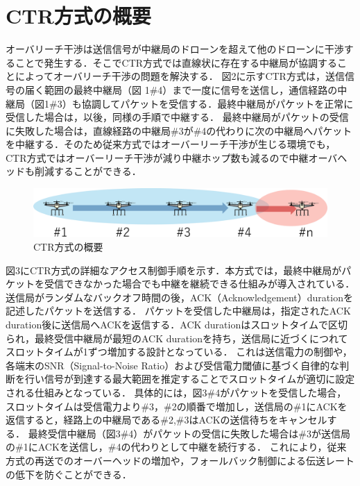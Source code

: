 \documentclass[a4paper,10pt]{ltjsarticle}
\begin{document}
\section{CTR方式の概要}
オーバリーチ干渉は送信信号が中継局のドローンを超えて他のドローンに干渉することで発生する．そこでCTR方式では直線状に存在する中継局が協調することによってオーバリーチ干渉の問題を解決する．
図2に示すCTR方式は，送信信号の届く範囲の最終中継局（図 1\#4）まで一度に信号を送信し，通信経路の中継局（図1\#3）も協調してパケットを受信する．最終中継局がパケットを正常に受信した場合は，以後，同様の手順で中継する．
最終中継局がパケットの受信に失敗した場合は，直線経路の中継局\#3が\#4の代わりに次の中継局へパケットを中継する．そのため従来方式ではオーバーリーチ干渉が生じる環境でも，CTR方式ではオーバーリーチ干渉が減り中継ホップ数も減るので中継オーバヘッドも削減することができる．
\begin{figure}[H]
  \centering
  \includegraphics[width=\linewidth]{CTR_topology.pdf} 
  \caption{CTR方式の概要}
  \label{fig:CTR方式のトポロジー} 
\end{figure}
図3にCTR方式の詳細なアクセス制御手順を示す．本方式では，最終中継局がパケットを受信できなかった場合でも中継を継続できる仕組みが導入されている．送信局がランダムなバックオフ時間の後，ACK（Acknowledgement）durationを記述したパケットを送信する．
パケットを受信した中継局は，指定されたACK duration後に送信局へACKを返信する．ACK durationはスロットタイムで区切られ，最終受信中継局が最短のACK durationを持ち，送信局に近づくにつれてスロットタイムが1ずつ増加する設計となっている．
これは送信電力の制御や，各端末のSNR（Signal-to-Noise Ratio）および受信電力閾値に基づく自律的な判断を行い信号が到達する最大範囲を推定することでスロットタイムが適切に設定される仕組みとなっている．
具体的には，図3\#4がパケットを受信した場合，スロットタイムは受信電力より\#3，\#2の順番で増加し，送信局の\#1にACKを返信すると，経路上の中継局である\#2,\#3はACKの送信待ちをキャンセルする．
最終受信中継局（図3\#4）がパケットの受信に失敗した場合は\#3が送信局の\#1にACKを送信し，\#4の代わりとして中継を続行する．
これにより，従来方式の再送でのオーバーヘッドの増加や，フォールバック制御による伝送レートの低下を防ぐことができる．
\end{document}
